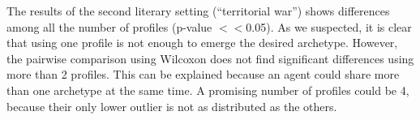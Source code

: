 \documentclass[letterpaper]{article}
\begin{document}
The results of the second literary setting (``territorial war'') shows differences among all the number of profiles (p-value $<<$0.05). As we suspected, it is clear that using one profile is not enough to emerge the desired archetype. However, the pairwise comparison using Wilcoxon does not find significant differences using more than 2 profiles. This can be explained because an agent could share more than one archetype at the same time.  A promising number of profiles could be 4, because their only lower outlier is not as distributed as the others. %

\begin{table}
\begin{center}
\end{center}
\vskip 0.25cm
\caption{Results for 30 executions of each configuration using 1 to 5 profiles (average best fitness $\pm$ std. dev).}
\label{tab:results}
\end{table}
\end{document}
